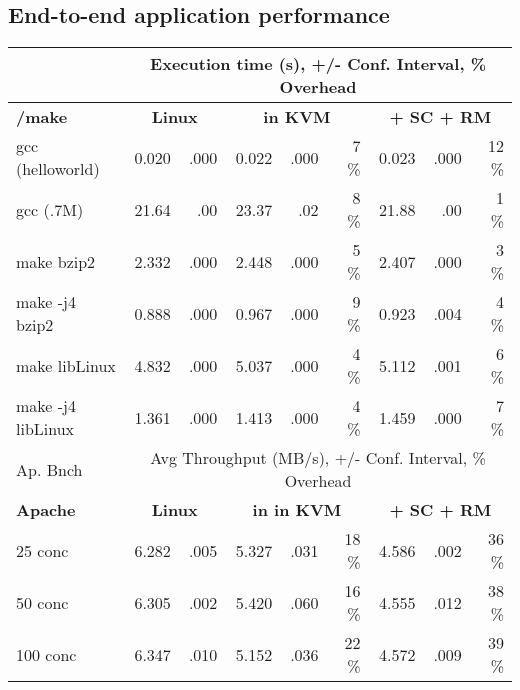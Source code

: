 \subsection{End-to-end application performance}
\label{sec:eval:perf:apps}


\begin{table}[t!b!]
	\footnotesize
	\centering
	
	\begin{tabular}{|l|rr|rrr|rrr|}
		\hline
		&\multicolumn{8}{c|}{Execution time (s), +/- Conf. Interval, \% Overhead} \\
		\hline
		{\bf \gcc/make} & \multicolumn{2}{c|}{\bf Linux} & \multicolumn{3}{c|}{{\bf in KVM}} & \multicolumn{3}{c|}{{\bf \graphene{} + SC + RM}}  \\
		\hline
		gcc (helloworld)  & 0.020 & .000 &  0.022 & .000 & 7 \% &  0.023 & .000 &  12 \%  \\\hline
		gcc (.7M\loc{})   & 21.64 &  .00 &  23.37 &  .02 & 8 \% &  21.88 &  .00 &   1 \%  \\\hline
		make bzip2        & 2.332 & .000 &  2.448 & .000 & 5 \% &  2.407 & .000 &   3 \%  \\\hline
		make -j4 bzip2    & 0.888 & .000 &  0.967 & .000 & 9 \% &  0.923 & .004 &   4 \%  \\\hline
		make libLinux     & 4.832 & .000 &  5.037 & .000 & 4 \% &  5.112 & .001 &   6 \%  \\\hline
		make -j4 libLinux & 1.361 & .000 &  1.413 & .000 & 4 \% &  1.459 & .000 &   7 \%  \\\hline
		
		
		
		\hline\hline
		Ap. Bnch     & \multicolumn{8}{c|}{Avg Throughput (MB/s), +/- Conf. Interval, \% Overhead} \\
		\hline
		{\bf Apache} & \multicolumn{2}{c|}{\bf Linux} & \multicolumn{3}{c|}{{\bf in in KVM}} & \multicolumn{3}{c|}{{\bf \graphene{} + SC + RM}}  \\
		\hline
		25 conc     & 6.282 & .005 & 5.327 & .031 & 18 \% & 4.586 & .002 & 36 \%  \\\hline
		50 conc     & 6.305 & .002 & 5.420 & .060 & 16 \% & 4.555 & .012 & 38 \%  \\\hline
		100 conc    & 6.347 & .010 & 5.152 & .036 & 22 \% & 4.572 & .009 & 39 \%  \\\hline
		

\end{tabular}
\end{table}
